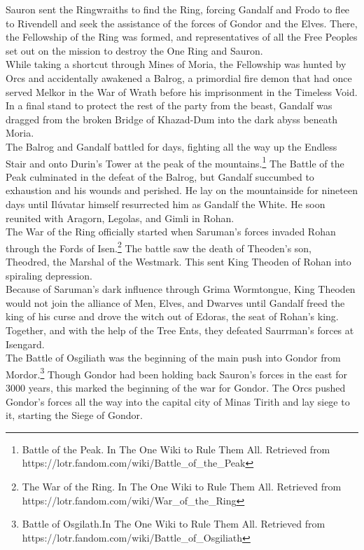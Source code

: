 \documentclass[10pt, letterpaper]{article}
\begin{document}
\noindent Sauron sent the Ringwraiths to find the Ring, forcing Gandalf and Frodo to flee to Rivendell and seek the assistance of the forces of Gondor and the Elves. There, the Fellowship of the Ring was formed, and representatives of all the Free Peoples set out on the mission to destroy the One Ring and Sauron. \\

\noindent While taking a shortcut through Mines of Moria, the Fellowship was hunted by Orcs and accidentally awakened a Balrog, a primordial fire demon that had once served Melkor in the War of Wrath before his imprisonment in the Timeless Void. In a final stand to protect the rest of the party from the beast, Gandalf was dragged from the broken Bridge of Khazad-Dum into the dark abyss beneath Moria. \\

\noindent The Balrog and Gandalf battled for days, fighting all the way up the Endless Stair and onto Durin’s Tower at the peak of the mountains.\footnote{Battle of the Peak. In The One Wiki to Rule Them All. Retrieved from  https://lotr.fandom.com/wiki/Battle\_of\_the\_Peak } The Battle of the Peak culminated in the defeat of the Balrog, but Gandalf succumbed to exhaustion and his wounds and perished. He lay on the mountainside for nineteen days until Ilúvatar himself resurrected him as Gandalf the White. He soon reunited with Aragorn, Legolas, and Gimli in Rohan. \\

\noindent The War of the Ring officially started when Saruman’s forces invaded Rohan through the Fords of Isen.\footnote{The War of the Ring. In The One Wiki to Rule Them All. Retrieved from https://lotr.fandom.com/wiki/War\_of\_the\_Ring } The battle saw the death of Theoden’s son, Theodred, the Marshal of the Westmark. This sent King Theoden of Rohan into spiraling depression. \\ 

\noindent Because of Saruman’s dark influence through Grima Wormtongue, King Theoden would not join the alliance of Men, Elves, and Dwarves until Gandalf freed the king of his curse and drove the witch out of Edoras, the seat of Rohan’s king. Together, and with the help of the Tree Ents, they defeated Saurrman’s forces at Isengard. \\

\noindent The Battle of Osgiliath was the beginning of the main push into Gondor from Mordor.\footnote{Battle of Osgilath.In The One Wiki to Rule Them All. Retrieved from https://lotr.fandom.com/wiki/Battle\_of\_Osgiliath} Though Gondor had been holding back Sauron’s forces in the east for 3000 years, this marked the beginning of the war for Gondor. The Orcs pushed Gondor’s forces all the way into the capital city of Minas Tirith and lay siege to it, starting the Siege of Gondor. \\
\end{document}

